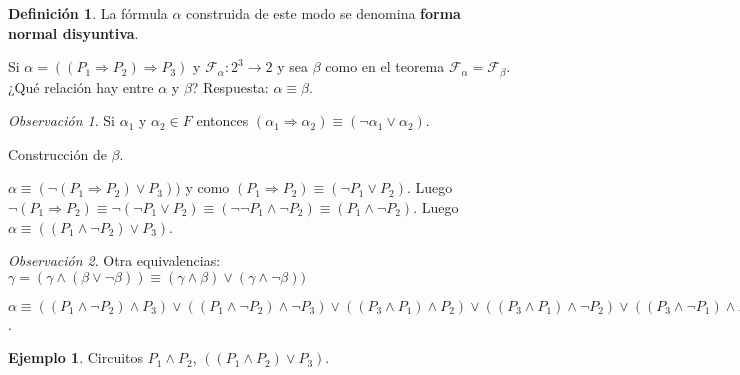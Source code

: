 \documentclass[a4paper,11pt]{article}
\theoremstyle{definition}
\newtheorem{defn}{Definición}[section]
\newtheorem{exap}{Ejemplo}[section]
\theoremstyle{remark}
\newtheorem*{remk}{Observación}
\def\FF{\mathcal{F}}
\def\FFa{\mathcal{F}_{\alpha}}
\begin{document}
\begin{defn}
La fórmula $\alpha$ construida de este modo se denomina \textbf{forma normal disyuntiva}.
\end{defn}

Si $\alpha = ((P_1 \Rightarrow P_2) \Rightarrow P_3)$ y $\FFa : 2^3 \to 2$ y sea $\beta$
como en el teorema $\FFa = \FF_{\beta}$. ¿Qué relación hay entre $\alpha$ y $\beta$? Respuesta: 
$\alpha \equiv \beta$.

\begin{remk}
Si $\alpha_1$ y $\alpha_2 \in F$ entonces $(\alpha_1 \Rightarrow \alpha_2) 
\equiv (\neg \alpha_1 \vee \alpha_2)$.
\end{remk}

Construcción de $\beta$.

$\alpha \equiv (\neg (P_1 \Rightarrow P_2) \vee P_3))$ y como 
$(P_1 \Rightarrow P_2) \equiv (\neg P_1 \vee P_2)$. Luego 
$\neg (P_1 \Rightarrow P_2) \equiv \neg(\neg P_1 \vee P_2) 
\equiv (\neg\neg P_1 \wedge \neg P_2) \equiv (P_1 \wedge \neg P_2)$.
Luego $\alpha \equiv ((P_1 \wedge \neg P_2) \vee P_3)$.

\begin{remk}
Otra equivalencias: $\gamma = (\gamma \wedge (\beta \vee \neg \beta)) 
\equiv (\gamma \wedge \beta) \vee (\gamma \wedge \neg \beta))$
\end{remk}

$\alpha \equiv ((P_1 \wedge \neg P_2) \wedge P_3) \vee ((P_1 \wedge \neg P_2) \wedge \neg P_3) 
\vee ((P_3 \wedge P_1) \wedge P_2) \vee ((P_3 \wedge P_1) \wedge \neg P_2)
\vee ((P_3 \wedge \neg P_1) \wedge P_2) \vee ((P_3 \wedge \neg P_1) \wedge \neg P_2)$.

\begin{exap}
 Circuitos $P_1 \wedge P_2$, $((P_1 \wedge P_2) \vee P_3)$.
\end{exap}
\end{document}
